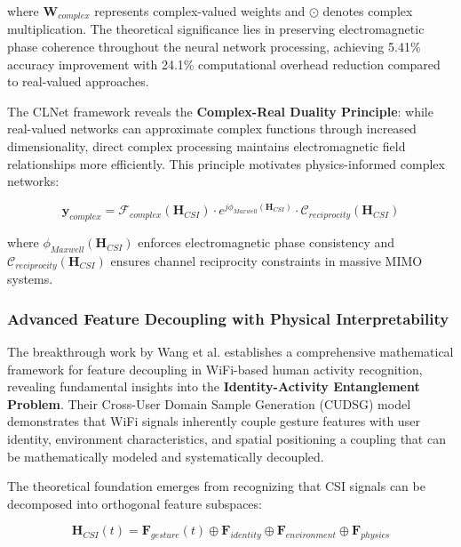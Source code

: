 \documentclass[journal]{IEEEtran}
\begin{document}
where $\mathbf{W}_{complex}$ represents complex-valued weights and $\odot$ denotes complex multiplication. The theoretical significance lies in preserving electromagnetic phase coherence throughout the neural network processing, achieving 5.41\% accuracy improvement with 24.1\% computational overhead reduction compared to real-valued approaches.

The CLNet framework reveals the \textbf{Complex-Real Duality Principle}: while real-valued networks can approximate complex functions through increased dimensionality, direct complex processing maintains electromagnetic field relationships more efficiently. This principle motivates physics-informed complex networks:

\begin{equation}
\mathbf{y}_{complex} = \mathcal{F}_{complex}(\mathbf{H}_{CSI}) \cdot e^{j\phi_{Maxwell}(\mathbf{H}_{CSI})} \cdot \mathcal{C}_{reciprocity}(\mathbf{H}_{CSI})
\label{eq:mimo_physics_complex}
\end{equation}

where $\phi_{Maxwell}(\mathbf{H}_{CSI})$ enforces electromagnetic phase consistency and $\mathcal{C}_{reciprocity}(\mathbf{H}_{CSI})$ ensures channel reciprocity constraints in massive MIMO systems.

\subsubsection{Advanced Feature Decoupling with Physical Interpretability}

The breakthrough work by Wang et al. \cite{wang2024feature} establishes a comprehensive mathematical framework for feature decoupling in WiFi-based human activity recognition, revealing fundamental insights into the \textbf{Identity-Activity Entanglement Problem}. Their Cross-User Domain Sample Generation (CUDSG) model demonstrates that WiFi signals inherently couple gesture features with user identity, environment characteristics, and spatial positioning a coupling that can be mathematically modeled and systematically decoupled.

The theoretical foundation emerges from recognizing that CSI signals can be decomposed into orthogonal feature subspaces:

\begin{equation}
\mathbf{H}_{CSI}(t) = \mathbf{F}_{gesture}(t) \oplus \mathbf{F}_{identity} \oplus \mathbf{F}_{environment} \oplus \mathbf{F}_{physics}
\label{eq:feature_decomposition}
\end{equation}
\end{document}
